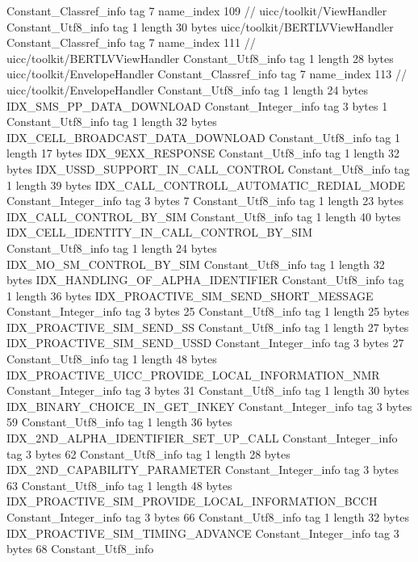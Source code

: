 {{		Constant_Classref_info {
			tag	7
			name_index	109		// uicc/toolkit/ViewHandler
		}
		Constant_Utf8_info {
			tag	1
			length	30
			bytes	uicc/toolkit/BERTLVViewHandler
		}
		Constant_Classref_info {
			tag	7
			name_index	111		// uicc/toolkit/BERTLVViewHandler
		}
		Constant_Utf8_info {
			tag	1
			length	28
			bytes	uicc/toolkit/EnvelopeHandler
		}
		Constant_Classref_info {
			tag	7
			name_index	113		// uicc/toolkit/EnvelopeHandler
		}
		Constant_Utf8_info {
			tag	1
			length	24
			bytes	IDX_SMS_PP_DATA_DOWNLOAD
		}
		Constant_Integer_info {
			tag	3
			bytes	1
		}
		Constant_Utf8_info {
			tag	1
			length	32
			bytes	IDX_CELL_BROADCAST_DATA_DOWNLOAD
		}
		Constant_Utf8_info {
			tag	1
			length	17
			bytes	IDX_9EXX_RESPONSE
		}
		Constant_Utf8_info {
			tag	1
			length	32
			bytes	IDX_USSD_SUPPORT_IN_CALL_CONTROL
		}
		Constant_Utf8_info {
			tag	1
			length	39
			bytes	IDX_CALL_CONTROLL_AUTOMATIC_REDIAL_MODE
		}
		Constant_Integer_info {
			tag	3
			bytes	7
		}
		Constant_Utf8_info {
			tag	1
			length	23
			bytes	IDX_CALL_CONTROL_BY_SIM
		}
		Constant_Utf8_info {
			tag	1
			length	40
			bytes	IDX_CELL_IDENTITY_IN_CALL_CONTROL_BY_SIM
		}
		Constant_Utf8_info {
			tag	1
			length	24
			bytes	IDX_MO_SM_CONTROL_BY_SIM
		}
		Constant_Utf8_info {
			tag	1
			length	32
			bytes	IDX_HANDLING_OF_ALPHA_IDENTIFIER
		}
		Constant_Utf8_info {
			tag	1
			length	36
			bytes	IDX_PROACTIVE_SIM_SEND_SHORT_MESSAGE
		}
		Constant_Integer_info {
			tag	3
			bytes	25
		}
		Constant_Utf8_info {
			tag	1
			length	25
			bytes	IDX_PROACTIVE_SIM_SEND_SS
		}
		Constant_Utf8_info {
			tag	1
			length	27
			bytes	IDX_PROACTIVE_SIM_SEND_USSD
		}
		Constant_Integer_info {
			tag	3
			bytes	27
		}
		Constant_Utf8_info {
			tag	1
			length	48
			bytes	IDX_PROACTIVE_UICC_PROVIDE_LOCAL_INFORMATION_NMR
		}
		Constant_Integer_info {
			tag	3
			bytes	31
		}
		Constant_Utf8_info {
			tag	1
			length	30
			bytes	IDX_BINARY_CHOICE_IN_GET_INKEY
		}
		Constant_Integer_info {
			tag	3
			bytes	59
		}
		Constant_Utf8_info {
			tag	1
			length	36
			bytes	IDX_2ND_ALPHA_IDENTIFIER_SET_UP_CALL
		}
		Constant_Integer_info {
			tag	3
			bytes	62
		}
		Constant_Utf8_info {
			tag	1
			length	28
			bytes	IDX_2ND_CAPABILITY_PARAMETER
		}
		Constant_Integer_info {
			tag	3
			bytes	63
		}
		Constant_Utf8_info {
			tag	1
			length	48
			bytes	IDX_PROACTIVE_SIM_PROVIDE_LOCAL_INFORMATION_BCCH
		}
		Constant_Integer_info {
			tag	3
			bytes	66
		}
		Constant_Utf8_info {
			tag	1
			length	32
			bytes	IDX_PROACTIVE_SIM_TIMING_ADVANCE
		}
		Constant_Integer_info {
			tag	3
			bytes	68
		}
		Constant_Utf8_info {
}}}
